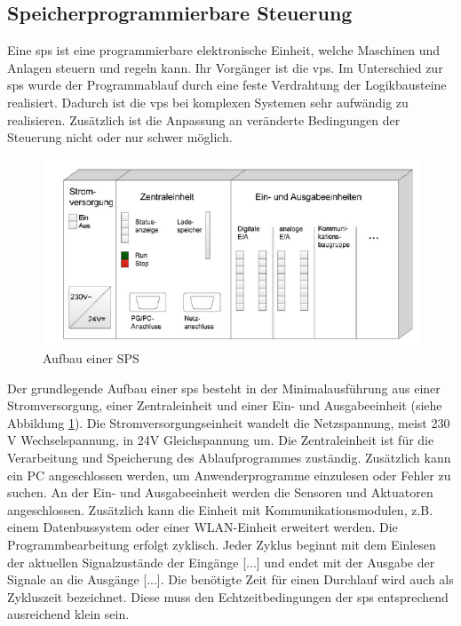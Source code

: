 \subsection{Speicherprogrammierbare Steuerung}
Eine \ac{sps} ist eine programmierbare elektronische Einheit, welche Maschinen und Anlagen steuern und regeln kann. Ihr Vorgänger ist die \ac{vps}. Im Unterschied zur \ac{sps} wurde der Programmablauf durch eine feste Verdrahtung der Logikbausteine realisiert. Dadurch ist die \ac{vps} bei komplexen Systemen sehr aufwändig zu realisieren. Zusätzlich ist die Anpassung an veränderte Bedingungen der Steuerung nicht oder nur schwer möglich.\autocite[vgl.][755]{Hering2021}
\begin{figure}[H]
   \centering
    \includegraphics[scale=0.75]{Bilder/SPS-Aufbau.png}
    \caption[Aufbau einer SPS]{Aufbau einer SPS
    \footnotemark}
    \label{fig:SPS_Aufbau}
\end{figure}
Der grundlegende Aufbau einer \ac{sps} besteht in der Minimalausführung aus einer Stromversorgung, einer Zentraleinheit und einer Ein- und Ausgabeeinheit (siehe Abbildung \ref{fig:SPS_Aufbau}). Die Stromversorgungseinheit wandelt die Netzspannung, meist 230 V Wechselspannung, in 24V Gleichspannung um. Die Zentraleinheit ist für die Verarbeitung und Speicherung des Ablaufprogrammes zuständig. Zusätzlich kann ein PC angeschlossen werden, um Anwenderprogramme einzulesen oder Fehler zu suchen. An der Ein- und Ausgabeeinheit werden die Sensoren und Aktuatoren angeschlossen. Zusätzlich kann die Einheit mit Kommunikationsmodulen, z.B. einem Datenbussystem oder einer WLAN-Einheit erweitert werden.\autocite[vgl.][1497\psq]{Boege2021} Die Programmbearbeitung erfolgt zyklisch. \glqq Jeder Zyklus beginnt mit dem Einlesen der aktuellen Signalzustände der Eingänge [...] und endet mit der Ausgabe der Signale an die Ausgänge [...]\grqq{}.\autocite[13]{Wellenreuther2005} Die benötigte Zeit für einen Durchlauf wird auch als Zykluszeit bezeichnet. Diese muss den Echtzeitbedingungen der \ac{sps} entsprechend ausreichend klein sein.\autocite[vgl.][13]{Wellenreuther2005}
